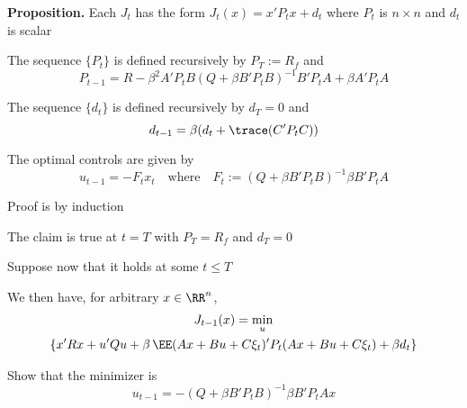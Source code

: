 \begin{frame}

    \textbf{Proposition.} Each $J_t$ has the form $J_t(x) = x' P_t x + d_t$ where
    $P_t$ is $n \times n$ and $d_t$ is scalar 

        \vspace{0.5em}
    The sequence $\{P_t\}$ is defined recursively by
    $P_T := R_f$ and
    \begin{equation*}
        P_{t-1} = R - \beta^2 A' P_t B (Q + \beta B' P_t B)^{-1} B'
            P_t A + \beta A' P_t A
    \end{equation*}

        \vspace{0.5em}
    The sequence $\{d_t\}$ is defined recursively by $d_T = 0$ 
    and
    \begin{equation*}
        d_{t-1} = \beta (d_t + \trace(C' P_t C))
    \end{equation*}

        \vspace{0.5em}
    The optimal controls are given by 
    \begin{equation*}
        u_{t-1}  = - F_t x_t
        \quad \text{where} \quad
        F_t := (Q + \beta B' P_t B)^{-1} \beta B' P_t A
    \end{equation*}
    
\end{frame}


\begin{frame}
    
    Proof is by induction

    The claim is true at $t=T$ with $P_T = R_f$ and $d_T = 0$
    
        \vspace{0.5em}
    Suppose now that it holds at some $t \leq T$
    
        \vspace{0.5em}
    We then have, for arbitrary $x \in \RR^n$,
    \begin{multline*}
        J_{t-1} (x) =
        \min_u 
        \\
        \{
            x' R x + u' Q u + \beta \,
            \EE (A x + B u + C \xi_t)' P_t (A x + B u + C \xi_t)
            + \beta d_t
        \}
    \end{multline*}

        \vspace{0.5em}
    \Ex Show that the minimizer is
    \begin{equation*}
        u_{t-1}  = - (Q + \beta B' P_t B)^{-1} \beta B' P_t A x
    \end{equation*}

\end{frame}



